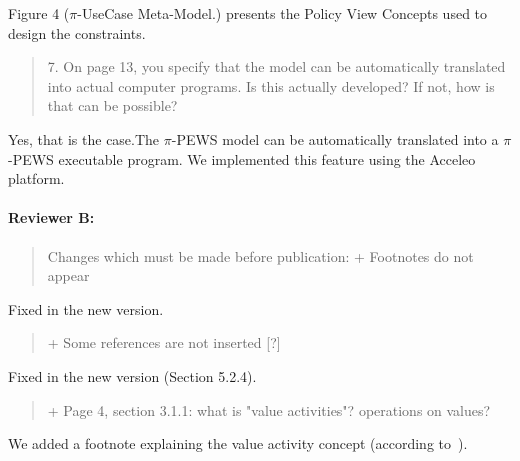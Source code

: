 \documentclass[12pt,a4wide]{article}
\begin{document}

Figure 4 ($\pi$-UseCase Meta-Model.) presents the Policy View Concepts used to design the constraints.

\begin{quotation}\sf\footnotesize

7.    On page 13, you specify that the model can be automatically translated into actual computer programs. Is this actually developed? If not, how is that can be possible? 
\end{quotation}
 
\noindent 
 
 
Yes, that is the case.The $\pi$-PEWS model can be automatically translated into a $\pi$-PEWS executable program. We implemented this feature using the Acceleo platform.
 
\paragraph*{Reviewer B:} 
\begin{quotation}\sf\footnotesize

Changes which must be made before publication: 
+ Footnotes do not appear 
\end{quotation}

\noindent 
Fixed in the new version.


\begin{quotation}\sf\footnotesize

+ Some references are not inserted [?] 
\end{quotation}

\noindent 
Fixed in the new version (Section 5.2.4).

\begin{quotation}\sf\footnotesize

+ Page 4, section 3.1.1: what is "value activities"? operations on values? 
\end{quotation}

\noindent 
We added a footnote explaining the value activity concept (according to~\cite{Gordijn02valuebased}).
\end{document}
